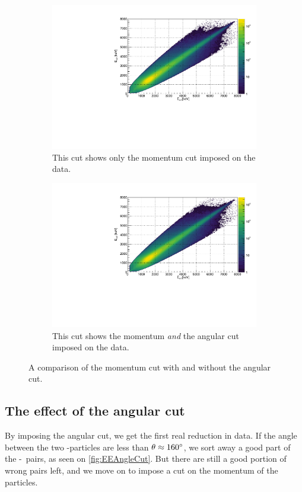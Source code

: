 \begin{figure}[H]
	\begin{subfigure}[t]{0.49\linewidth}
		\includegraphics[width=\linewidth]{../figures/EEMomentumCut.pdf}
		\caption{This cut shows only the momentum cut imposed on the data.}
	\end{subfigure}\hfill
	\begin{subfigure}[t]{0.49\linewidth}
		\includegraphics[width=\linewidth]{../figures/EEAngAndMoment.pdf}
		\caption{This cut shows the momentum \textit{and} the angular cut imposed on the data.}
	\end{subfigure}
\caption{A comparison of the momentum cut with and without the angular cut.}
\label{fig:AngAndMomentCompare}
\end{figure}

\subsection{The effect of the angular cut}
By imposing the angular cut, we get the first real reduction in data. If the angle between the two \al-particles are less than $\theta \approx 160\degree$, we sort away a good part of the \be-\al\ pairs, as seen on \cref{fig:EEAngleCut}. But there are still a good portion of wrong pairs left, and we move on to impose a cut on the momentum of the particles. 


